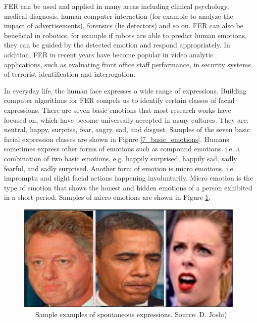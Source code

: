 \documentclass[master]{thesis-uestc}
\begin{document}
FER can be used and applied in many areas including clinical psychology, medical diagnosis, human computer interaction (for example to analyze the impact of advertisements), forensics (lie detectors) and so on\cite{Ivanovsky-2017, sang-2017}. FER can also be beneficial in robotics, for example if robots are able to predict human emotions, they can be guided by the detected emotion and respond appropriately. In addition, FER in recent years have become popular in video analytic applications, such as evaluating front office staff performance, in security systems of terrorist identification and interrogation\cite{sang-2017}.

In everyday life, the human face expresses a wide range of expressions. Building computer algorithms for FER compels us to identify certain classes of facial expressions. There are seven basic emotions that most research works have focused on, which have become universally accepted in many cultures. They are: neutral, happy, surprise, fear, angry, sad, and disgust\cite{Yu:2013:LRF:2459511.2459661}. Samples of the seven basic facial expression classes are shown in Figure \ref{7_basic_emotions}. Humans sometimes express other forms of emotions such as compound emotions, i.e. a combination of two basic emotions, e.g. happily surprised, happily sad, sadly fearful, and sadly surprised. Another form of emotion is micro emotions, i.e. impromptu and slight facial actions happening involuntarily. Micro emotion is the type of emotion that shows the honest and hidden emotions of a person exhibited in a short period\cite{josh2018}. Samples of micro emotions are shown in Figure \ref{micro_emotions}.

\begin{figure}[ht]
\includegraphics[width=5in]{pic/micro_expressions.png}
\caption{\,\,\,\,\,\,\,\,\,\,Sample examples of spontaneous expressions. Source: D. Joshi\cite{josh2018})}
\label{micro_emotions}
\end{figure}
\end{document}
